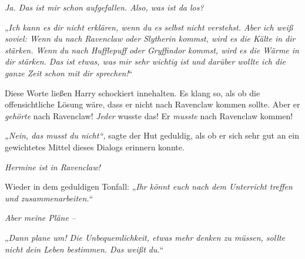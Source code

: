 \emph{Ja. Das ist mir schon aufgefallen. Also, was ist da los? }

„\emph{Ich kann es dir nicht erklären, wenn du es selbst nicht verstehst. Aber ich weiß soviel: Wenn du nach Ravenclaw oder Slytherin kommst, wird es die Kälte in dir stärken. Wenn du nach Hufflepuff oder Gryffindor kommst, wird es die Wärme in dir stärken. Das ist etwas, was mir sehr wichtig ist und darüber wollte ich die ganze Zeit schon mit dir sprechen!}“

Diese Worte ließen Harry schockiert innehalten. Es klang so, als ob die offensichtliche Lösung wäre, dass er nicht nach Ravenclaw kommen sollte. Aber er \emph{gehörte} nach Ravenclaw! \emph{Jeder} wusste das! Er \emph{musste} nach Ravenclaw kommen!

\emph{„Nein, das musst du nicht“,} sagte der Hut geduldig, als ob er sich sehr gut an ein gewichtetes Mittel dieses Dialogs erinnern konnte.

\emph{Hermine ist in Ravenclaw!}

Wieder in dem geduldigen Tonfall: „\emph{Ihr könnt euch nach dem Unterricht treffen und zusammenarbeiten.}“

\emph{Aber meine Pläne – }

„\emph{Dann plane um! Die Unbequemlichkeit, etwas mehr denken zu müssen, sollte nicht dein Leben bestimmen. Das \emph{weißt} du.}“


